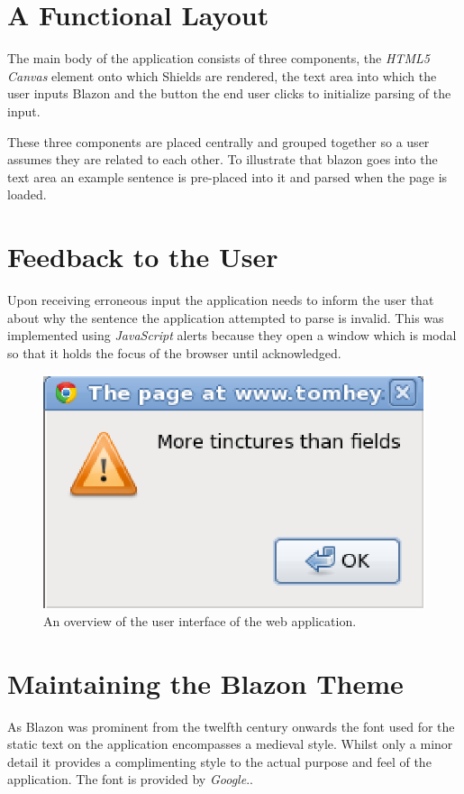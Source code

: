 \section{A Functional Layout}

The main body of the application consists of three components, the \emph{HTML5 Canvas} element onto which Shields are rendered, the text area into which the user inputs Blazon and the button the end user clicks  to initialize parsing of the input.


These three components are placed centrally and grouped together so a user assumes they are related to each other.  To illustrate that blazon goes into the text area an example sentence is pre-placed into it and parsed when the page is loaded.


\section{Feedback to the User}
Upon receiving erroneous input the application needs to inform the user that about why the sentence the application attempted to parse is invalid.  This was implemented using \emph{JavaScript} alerts because they open a window which is modal so that it holds the focus of the browser until acknowledged. 


\begin{figure}[H]
  \centering
    \includegraphics[width=\textwidth]{design/images/error.eps}
  \caption{An overview of the user interface of the web application.}
  \label{fig:itsallgonewrong}
  
\end{figure}



\section{Maintaining the Blazon Theme}
As Blazon was prominent from the twelfth century onwards the font used for the static text on the application encompasses a medieval style.  Whilst only a 
minor detail it provides a complimenting style to the actual purpose and feel of the application.  The font is provided by \emph{Google}.\cite{font}. 

